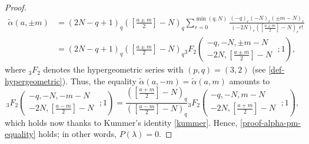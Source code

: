 \documentclass[10pt,a4paper]{amsart}
\begin{document}
\begin{proof}
\begin{equation}
\begin{aligned}
\widetilde{\alpha}(a, \pm m) &= (2N-q+1)_q \left(\left[\frac{a\pm m}{2}\right]-N\right)_q \sum_{r=0}^{\min(q,N)}\frac{(-q)_r(-N)_r( \pm m-N)_r}{(-2N)_r \left(\left[\frac{a\pm m}{2}\right]-N\right)_r r!}\\
& = (2N-q+1)_q \left(\left[\frac{a\pm m}{2}\right]-N\right)_q {}_3F_2\left(\begin{matrix}
-q, -N, \pm m -N\\
-2N, \left[\frac{a\pm m}{2}\right]-N
\end{matrix}\; ; 1\right),
\end{aligned}
\end{equation}
where ${}_3F_2$ denotes the hypergeometric series with $(p,q) = (3,2)$ (see \eqref{def-hypergeometric}). Thus, the equality $\widetilde{\alpha}(a, -m) = \widetilde{\alpha}(a, m)$ amounts to
\begin{equation*}
_3F_2\left(\begin{matrix}
-q, -N, -m -N\\
-2N, \left[\frac{a-m}{2}\right]-N
\end{matrix}\; ; 1\right) = \frac{\left(\left[\frac{a+ m}{2}\right]-N\right)_q}{\left(\left[\frac{a- m}{2}\right]-N\right)_q}{}_3F_2\left(\begin{matrix}
-q, -N, m -N\\
-2N, \left[\frac{a+ m}{2}\right]-N
\end{matrix}\; ; 1\right),
\end{equation*}
which holds now thanks to Kummer's identity \eqref{kummer}. Hence, \eqref{proof-alpha-pm-equality} holds; in other words, $P(\lambda) = 0$.
\end{proof}
\end{document}
